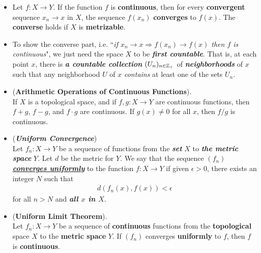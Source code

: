 \documentclass[11pt]{article}
\begin{document}
\begin{itemize}
\item \begin{proposition}
Let $f: X \rightarrow Y$. If the function $f$ is \textbf{continuous}, then for every \textbf{convergent} sequence $x_n \rightarrow x$ in $X$, the sequence $f(x_n)$ \textbf{converges} to $f(x)$. The \textbf{converse} holds if $X$ is \textbf{metrizable}.
\end{proposition}

\item \begin{remark}
To show the converse part, i.e. ``\emph{if $x_n \rightarrow x \Rightarrow f(x_n) \rightarrow f(x)$ then $f$ is continuous}", we just need the space $X$ to be \emph{\textbf{first countable}}. That is, at each point $x$, there is \emph{\textbf{a countable collection}} $(U_{n})_{n \in {\mathbb Z}_{+}}$ of \emph{\textbf{neighborhoods}} of $x$ such that any neighborhood $U$ of $x$ \emph{contains} at least one of the sets $U_n$.
\end{remark}

\item \begin{proposition} (\textbf{Arithmetic Operations of Continuous Functions}).\\
If $X$ is a topological space, and if $f, g : X \rightarrow Y$ are continuous functions, then $f + g$,  $f - g$, and $f \cdot g$ are continuous. If $g(x) \neq 0$ for all $x$, then $f/g$ is continuous.
\end{proposition}

\item \begin{definition} (\emph{\textbf{Uniform Convergence}})\\
Let $f_n : X \rightarrow Y$ be a sequence of functions from the \textbf{\emph{set}} $X$ to \emph{\textbf{the metric space}} $Y$. Let $d$ be the metric for $Y$. We say that the sequence $(f_n)$ \underline{\emph{\textbf{converges uniformly}}} to the function $f: X \rightarrow Y$ if given $\epsilon > 0$, there exists an integer $N$ such that
\begin{align*}
d(f_n(x), f(x)) < \epsilon
\end{align*}
for all $n > N$ and \textbf{\emph{all $x$ in $X$}}.
\end{definition}

\item \begin{theorem} (\textbf{Uniform Limit Theorem}). \citep{munkres2000topology}\\
Let $f_n : X \rightarrow Y$ be a sequence of  \textbf{continuous} functions from the \textbf{topological} space $X$ to the \textbf{metric space} $Y$. If $(f_n)$ converges
\textbf{uniformly} to $f$, then $f$ is \textbf{continuous}.
\end{theorem}
\end{itemize}
\end{document}
